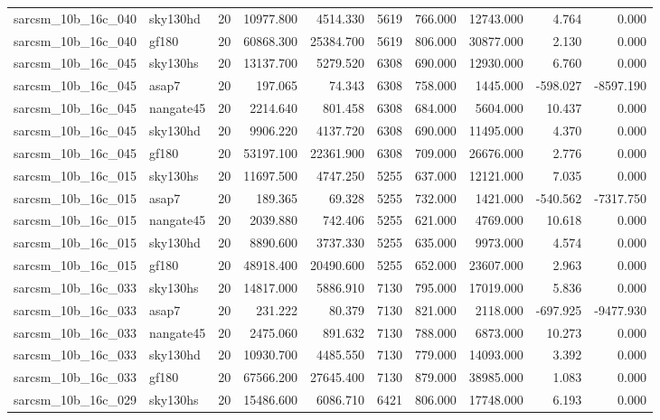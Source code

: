 \begin{tabular}{llrrrrrrrr}
sarcsm\_10b\_16c\_040 & sky130hd & 20 & 10977.800 & 4514.330 & 5619 & 766.000 & 12743.000 & 4.764 & 0.000 \\
sarcsm\_10b\_16c\_040 & gf180 & 20 & 60868.300 & 25384.700 & 5619 & 806.000 & 30877.000 & 2.130 & 0.000 \\
sarcsm\_10b\_16c\_045 & sky130hs & 20 & 13137.700 & 5279.520 & 6308 & 690.000 & 12930.000 & 6.760 & 0.000 \\
sarcsm\_10b\_16c\_045 & asap7 & 20 & 197.065 & 74.343 & 6308 & 758.000 & 1445.000 & -598.027 & -8597.190 \\
sarcsm\_10b\_16c\_045 & nangate45 & 20 & 2214.640 & 801.458 & 6308 & 684.000 & 5604.000 & 10.437 & 0.000 \\
sarcsm\_10b\_16c\_045 & sky130hd & 20 & 9906.220 & 4137.720 & 6308 & 690.000 & 11495.000 & 4.370 & 0.000 \\
sarcsm\_10b\_16c\_045 & gf180 & 20 & 53197.100 & 22361.900 & 6308 & 709.000 & 26676.000 & 2.776 & 0.000 \\
sarcsm\_10b\_16c\_015 & sky130hs & 20 & 11697.500 & 4747.250 & 5255 & 637.000 & 12121.000 & 7.035 & 0.000 \\
sarcsm\_10b\_16c\_015 & asap7 & 20 & 189.365 & 69.328 & 5255 & 732.000 & 1421.000 & -540.562 & -7317.750 \\
sarcsm\_10b\_16c\_015 & nangate45 & 20 & 2039.880 & 742.406 & 5255 & 621.000 & 4769.000 & 10.618 & 0.000 \\
sarcsm\_10b\_16c\_015 & sky130hd & 20 & 8890.600 & 3737.330 & 5255 & 635.000 & 9973.000 & 4.574 & 0.000 \\
sarcsm\_10b\_16c\_015 & gf180 & 20 & 48918.400 & 20490.600 & 5255 & 652.000 & 23607.000 & 2.963 & 0.000 \\
sarcsm\_10b\_16c\_033 & sky130hs & 20 & 14817.000 & 5886.910 & 7130 & 795.000 & 17019.000 & 5.836 & 0.000 \\
sarcsm\_10b\_16c\_033 & asap7 & 20 & 231.222 & 80.379 & 7130 & 821.000 & 2118.000 & -697.925 & -9477.930 \\
sarcsm\_10b\_16c\_033 & nangate45 & 20 & 2475.060 & 891.632 & 7130 & 788.000 & 6873.000 & 10.273 & 0.000 \\
sarcsm\_10b\_16c\_033 & sky130hd & 20 & 10930.700 & 4485.550 & 7130 & 779.000 & 14093.000 & 3.392 & 0.000 \\
sarcsm\_10b\_16c\_033 & gf180 & 20 & 67566.200 & 27645.400 & 7130 & 879.000 & 38985.000 & 1.083 & 0.000 \\
sarcsm\_10b\_16c\_029 & sky130hs & 20 & 15486.600 & 6086.710 & 6421 & 806.000 & 17748.000 & 6.193 & 0.000 \\

\end{tabular}

